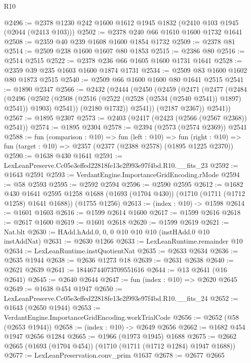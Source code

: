 \begin{lexlean}{R10}
\begin{coremodule}
@2496 := @2378 @1230 @242 @1600 @1612 @1945 @1832 (@2410 @103 @1945 (@2044 (@2413 @103)))
@2502 := @2378 @240 @66 @1610 @1600 @1732 @1641
@2508 := @2359 @40 @239 @1608 @1600 @1854 @1732
@2509 := @2378 @81
@2514 := @2509 @238 @1600 @1607 @80 @1853
@2515 := @2386 @80
@2516 := @2514 @2515
@2522 := @2378 @236 @66 @1605 @1600 @1731 @1641
@2528 := @2359 @39 @235 @1603 @1600 @1874 @1731
@2534 := @2509 @83 @1600 @1602 @80 @1873 @2515
@2540 := @2509 @66 @1600 @1600 @80 @1641 @2515
@2541 := @1890 @2347
@2566 := @2432
    (@2444
      (@2450
        (@2459
          (@2471
            (@2477
              (@2484
                (@2496
                  (@2502
                    (@2508 (@2516 (@2522 (@2528 (@2534 (@2540 @2541)) @1897) @2541)) @1903)
                    @2541))
                (@2180 @1732))
              @2541))
          (@2187 @2367))
        @2541))
@2567 := @1895 @2307
@2573 := @2403 (@2417 (@2423 (@2566 (@2567 @2368)) @2541))
@2574 := @1895 @2304
@2578 := @2394 (@2573 (@2574 @2369)) @2541
@2588 := fun (comparison : @10) =>
  fun (left : @10) =>
  fun (right : @10) => fun (target : @10) => @2357 (@2377 (@2388 @2578) (@1895 @1225 @2370))
@2590 := @1638 @430 @1641
@2591 := LexLeanPreserve.Cc05e3effed22818fe13e2f993e97f4bd.R10.__fits_23
@2592 := @1643 @2591
@2593 := VerdantEngine.ImportanceGridEncoding.rMode
@2594 := @58 @2593
@2595 := @2592 @2594
@2596 := @2590 @2595
@2612 := @1682
    @430
    @1641
    @2595
    @1258
    @1688
    (@1693 (@1704 @430))
    (@1710 (@1711 (@1712 @1258) @1641 @1688))
    (@1755 @1256)
@2613 := (index : @10) -> @1598
@2614 := @1601 @1603
@2616 := @1599 @2614 @1600
@2617 := @1599 @2616
@2618 := @2617 @1600
@2619 := @1601 @2618
@2620 := @1599 @2619
@2621 := Nat.blt
@2630 := HAdd.hAdd.{0, 0, 0} @10 @10 @10 (instHAdd.{0} @10 instAddNat)
@2631 := @2630 @1266
@2633 := LexLeanRuntime.remainder @10
@2634 := LexLeanRuntime.instQuotientNat
@2635 := @2633 @2634
@2636 := @2635 @1944
@2638 := @2636 @1273 @18
@2639 := @2631 @2638
@2640 := @2621 @2639
@2641 := 18446744073709551616
@2644 := @13 @2641 (@16 @2641)
@2645 := @2640 @2644
@2647 := fun (index : @10) => @2620 @2645
@2649 := @1638 @454 @1947
@2650 := LexLeanPreserve.Cc05e3effed22818fe13e2f993e97f4bd.R10.__fits_24
@2652 := @1643 (@2650 @1944)
@2653 := VerdantEngine.ImportanceGridEncoding.workTrialCode
@2656 := @2652 (@58 (@2653 @1944))
@2658 := (index : @10) -> @2649 @2656
@2662 := @1682 @454 @1947 @2656 @1284
@2665 := @1966 (@1973 @1945) @1688
@2675 := @2662 @2665 (@1693 (@1704 @454)) (@1710 (@1711 (@1712 @1284) @1947 @1688))
@2677 := LexLeanPreservation.conv_prim @1637
@2678 := @2677 @2665

\end{coremodule}
\end{lexlean}
